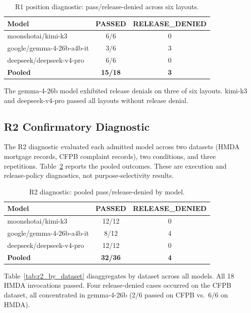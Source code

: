 \begin{table}[t]
\centering
\caption{R1 position diagnostic: pass/release-denied across six layouts.}
\label{tab:r1_position}
\small
\begin{tabular}{lcc}
\toprule
Model & PASSED & RELEASE\_DENIED \\
\midrule
moonshotai/kimi-k3 & 6/6 & 0 \\
google/gemma-4-26b-a4b-it & 3/6 & 3 \\
deepseek/deepseek-v4-pro & 6/6 & 0 \\
\midrule
\textbf{Pooled} & \textbf{15/18} & \textbf{3} \\
\bottomrule
\end{tabular}
\end{table}

The gemma-4-26b model exhibited release denials on three of six layouts.
kimi-k3 and deepseek-v4-pro passed all layouts without release denial.

\subsection{R2 Confirmatory Diagnostic}

The R2 diagnostic evaluated each admitted model across two datasets
(HMDA mortgage records, CFPB complaint records), two conditions, and three
repetitions. Table~\ref{tab:r2_matrix} reports the pooled outcomes. These
are execution and release-policy diagnostics, not purpose-selectivity
results.

\begin{table}[t]
\centering
\caption{R2 diagnostic: pooled pass/release-denied by model.}
\label{tab:r2_matrix}
\small
\begin{tabular}{lcc}
\toprule
Model & PASSED & RELEASE\_DENIED \\
\midrule
moonshotai/kimi-k3 & 12/12 & 0 \\
google/gemma-4-26b-a4b-it & 8/12 & 4 \\
deepseek/deepseek-v4-pro & 12/12 & 0 \\
\midrule
\textbf{Pooled} & \textbf{32/36} & \textbf{4} \\
\bottomrule
\end{tabular}
\end{table}

Table~\ref{tab:r2_by_dataset} disaggregates by dataset across all models.
All 18 HMDA invocations passed. Four release-denied cases occurred on the
CFPB dataset, all concentrated in gemma-4-26b (2/6 passed on CFPB vs.\ 6/6
on HMDA).

